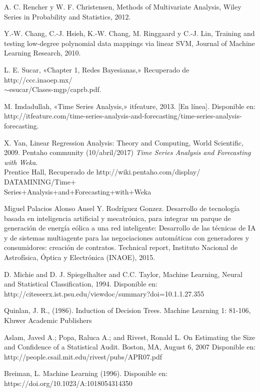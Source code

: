 \begin{thebibliography}{a}
	 A. C. Rencher y W. F. Christensen, Methods of Multivariate Analysis, Wiley Series in Probability and Statistics, 2012.

	 Y.-W. Chang, C.-J. Hsieh, K.-W. Chang, M. Ringgaard y C.-J. Lin, Training and testing low-degree
polynomial data mappings via linear SVM, Journal of Machine Learning Research, 2010.
	
	 L. E. Sucar, «Chapter 1, Redes Bayesianas,» Recuperado de
	http://ccc.inaoep.mx/\\$\sim$esucar/Clases-mgp/caprb.pdf. %

	 M. Imdadullah, «Time Series Analysis,» itfeature, 2013. [En línea]. Disponible en:
http://itfeature.com/time-series-analysis-and-forecasting/time-series-analysis-forecasting.

	 X. Yan, Linear Regression Analysis: Theory and Computing, World Scientific,
2009.
	  Pentaho community (10/abril/2017) {\it Time Series Analysis and
	Forecasting with Weka}.\\ Prentice Hall, Recuperado de http://wiki.pentaho.com/display/
	DATAMINING/Time+\\Series+Analysis+and+Forecasting+with+Weka
	
		 Miguel Palacios Alonso Ansel Y. Rodríguez Gonzez. Desarrollo de tecnología basada en inteligencia artificial y mecatrónica, para integrar un parque de generación de energía eólica a una red inteligente: 
	Desarrollo de las técnicas de IA y de sistemas multiagente para las negociaciones automáticas con generadores y consumidores: creación de contratos.
	Technical report, Instituto Nacional de Astrofísica, Óptica y Electrónica (INAOE), 2015.
	
	 D. Michie and D. J. Spiegelhalter and C.C. Taylor, 
	Machine Learning, Neural and Statistical Classification, 1994. Disponible en: 
	http://citeseerx.ist.psu.edu/viewdoc/summary?doi=10.1.1.27.355

	 Quinlan, J. R., (1986). Induction of Decision Trees. Machine Learning 1: 81-106, Kluwer Academic Publishers
	
	 Aslam, Javed A.; Popa, Raluca A.; and Rivest, Ronald L. On Estimating the Size and Confidence of a Statistical Audit. Boston, MA, August 6, 2007 Disponible en: http://people.csail.mit.edu/rivest/pubs/APR07.pdf
	
		Breiman, L. Machine Learning (1996). Disponible en: https://doi.org/10.1023/A:1018054314350
	
\end{thebibliography}
